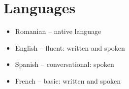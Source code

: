 \documentclass[10pt,letterpaper]{article}
\begin{document}
\section{Languages}
\begin{itemize}%
\item Romanian -- native language
\item English -- fluent: written and spoken
\item Spanish -- conversational: spoken
\item French -- basic: written and spoken
\end{itemize}
\end{document}
